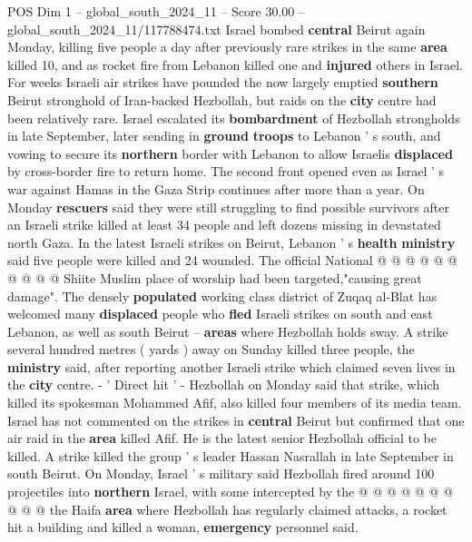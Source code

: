 \begin{textsample}{POS Dim 1 – global\_south\_2024\_11 – Score 30.00 – global\_south\_2024\_11/117788474.txt}  \label{ex:f1_pos_248}
Israel bombed \textbf{central} Beirut again Monday, killing five people a day after previously rare strikes in the same \textbf{area} killed 10, and as rocket fire from Lebanon killed one and \textbf{injured} others in Israel.
For weeks Israeli air strikes have pounded the now largely emptied \textbf{southern} Beirut stronghold of Iran-backed Hezbollah, but raids on the \textbf{city} centre had been relatively rare.
Israel escalated its \textbf{bombardment} of Hezbollah strongholds in late September, later sending in \textbf{ground} \textbf{troops} to Lebanon ' s south, and vowing to secure its \textbf{northern} border with Lebanon to allow Israelis \textbf{displaced} by cross-border fire to return home.
The second front opened even as Israel ' s war against Hamas in the Gaza Strip continues after more than a year.
On Monday \textbf{rescuers} said they were still struggling to find possible survivors after an Israeli strike killed at least 34 people and left dozens missing in devastated north Gaza.
In the latest Israeli strikes on Beirut, Lebanon ' s \textbf{health} \textbf{ministry} said five people were killed and 24 wounded.
The official National @ @ @ @ @ @ @ @ @ @ Shiite Muslim place of worship had been targeted,"causing great damage".
The densely \textbf{populated} working class district of Zuqaq al-Blat has welcomed many \textbf{displaced} people who \textbf{fled} Israeli strikes on south and east Lebanon, as well as south Beirut -- \textbf{areas} where Hezbollah holds sway.
A strike several hundred metres ( yards ) away on Sunday killed three people, the \textbf{ministry} said, after reporting another Israeli strike which claimed seven lives in the \textbf{city} centre. - ' Direct hit ' - Hezbollah on Monday said that strike, which killed its spokesman Mohammed Afif, also killed four members of its media team.
Israel has not commented on the strikes in \textbf{central} Beirut but confirmed that one air raid in the \textbf{area} killed Afif.
He is the latest senior Hezbollah official to be killed.
A strike killed the group ' s leader Hassan Nasrallah in late September in south Beirut.
On Monday, Israel ' s military said Hezbollah fired around 100 projectiles into \textbf{northern} Israel, with some intercepted by the @ @ @ @ @ @ @ @ @ @ the Haifa \textbf{area} where Hezbollah has regularly claimed attacks, a rocket hit a building and killed a woman, \textbf{emergency} personnel said.

\end{textsample}
